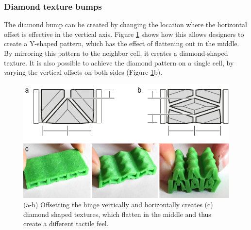 \subsubsection{Diamond texture bumps}
The diamond bump can be created by changing the location where the horizontal offset is effective in the vertical axis. Figure \ref{fig:15-diamond-patterns} shows how this allows designers to create a Y-shaped pattern, which has the effect of flattening out in the middle. By mirroring this pattern to the neighbor cell, it creates a diamond-shaped texture. It is also possible to achieve the diamond pattern on a single cell, by varying the vertical offsets on both sides (Figure \ref{fig:15-diamond-patterns}b).

\begin{figure} [h]  
    \includegraphics[width=\textwidth]{chapters/metamaterial-textures-FIG/15-diamond-patterns.pdf}
    \caption[Short figure name.]{(a-b) Offsetting the hinge vertically and horizontally creates (c) diamond shaped textures, which flatten in the middle and thus create a different tactile feel.
    \label{fig:15-diamond-patterns}}
\end{figure}






